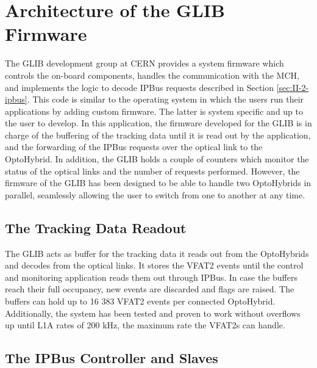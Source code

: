   \section{Architecture of the GLIB Firmware}

    The GLIB development group at CERN provides a system firmware which controls the on-board components, handles the communication with the MCH, and implements the logic to decode IPBus requests described in Section \ref{sec:II-2-ipbus}. This code is similar to the operating system in which the users run their applications by adding custom firmware. The latter is system specific and up to the user to develop. In this application, the firmware developed for the GLIB is in charge of the buffering of the tracking data until it is read out by the application, and the forwarding of the IPBus requests over the optical link to the OptoHybrid. In addition, the GLIB holds a couple of counters which monitor the status of the optical links and the number of requests performed. However, the firmware of the GLIB has been designed to be able to handle two OptoHybrids in parallel, seamlessly allowing the user to switch from one to another at any time.

    \subsection{The Tracking Data Readout}

      The GLIB acts as buffer for the tracking data it reads out from the OptoHybrids and decodes from the optical links. It stores the VFAT2 events until the control and monitoring application reads them out through IPBus. In case the buffers reach their full occupancy, new events are discarded and flags are raised. The buffers can hold up to 16 383 VFAT2 events per connected OptoHybrid. Additionally, the system has been tested and proven to work without overflows up until L1A rates of 200 kHz, the maximum rate the VFAT2s can handle.

    \subsection{The IPBus Controller and Slaves}

